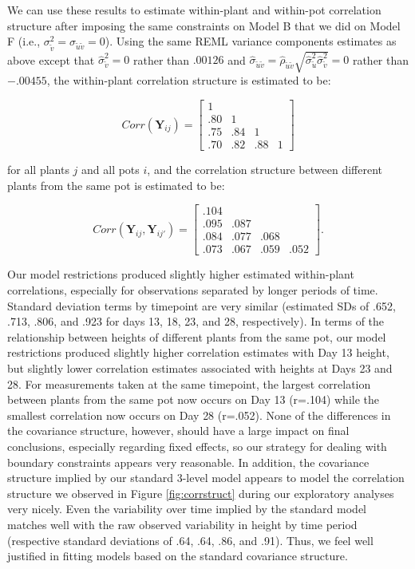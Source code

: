 \documentclass[
]{krantz}
\begin{document}
We can use these results to estimate within-plant and within-pot correlation structure after imposing the same constraints on Model B that we did on Model F (i.e., \(\sigma_{\tilde{v}}^{2}=\sigma_{\tilde{u}\tilde{v}}=0\)). Using the same REML variance components estimates as above except that \(\hat{\sigma}_{\tilde{v}}^{2}=0\) rather than \(.00126\) and \(\hat{\sigma}_{\tilde{u}\tilde{v}}=\hat{\rho}_{\tilde{u}\tilde{v}}\sqrt{\hat{\sigma}_{\tilde{u}}^{2}\hat{\sigma}_{\tilde{v}}^{2}}=0\) rather than \(-.00455\), the within-plant correlation structure is estimated to be:

\[  Corr(\textbf{Y}_{ij}) = \left[
          \begin{array}{cccc}
            1 & & & \\
            .80 & 1 & & \\
            .75 & .84 & 1 & \\
            .70 & .82 & .88 & 1
          \end{array} \right] \]

for all plants \(j\) and all pots \(i\), and the correlation structure between different plants from the same pot is estimated to be:

\[  Corr(\textbf{Y}_{ij},\textbf{Y}_{ij'}) = \left[
          \begin{array}{cccc}
            .104 & & & \\
            .095 & .087 & & \\
            .084 & .077 & .068 & \\
            .073 & .067 & .059 & .052
          \end{array} \right]. \]

Our model restrictions produced slightly higher estimated within-plant correlations, especially for observations separated by longer periods of time. Standard deviation terms by timepoint are very similar (estimated SDs of .652, .713, .806, and .923 for days 13, 18, 23, and 28, respectively). In terms of the relationship between heights of different plants from the same pot, our model restrictions produced slightly higher correlation estimates with Day 13 height, but slightly lower correlation estimates associated with heights at Days 23 and 28. For measurements taken at the same timepoint, the largest correlation between plants from the same pot now occurs on Day 13 (r=.104) while the smallest correlation now occurs on Day 28 (r=.052). None of the differences in the covariance structure, however, should have a large impact on final conclusions, especially regarding fixed effects, so our strategy for dealing with boundary constraints appears very reasonable. In addition, the covariance structure implied by our standard 3-level model appears to model the correlation structure we observed in Figure \ref{fig:corrstruct} during our exploratory analyses very nicely. Even the variability over time implied by the standard model matches well with the raw observed variability in height by time period (respective standard deviations of .64, .64, .86, and .91). Thus, we feel well justified in fitting models based on the standard covariance structure.
\end{document}
